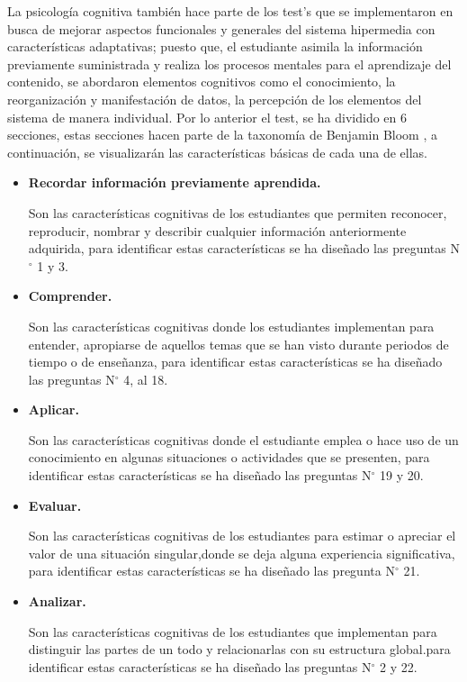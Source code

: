 La psicología cognitiva también hace parte de los test’s que se implementaron en busca de mejorar aspectos funcionales y generales del sistema hipermedia con características adaptativas; puesto que, el estudiante asimila la información previamente suministrada y realiza los procesos mentales para el aprendizaje del contenido, se abordaron elementos cognitivos como el conocimiento, la reorganización y manifestación de datos, la percepción de los elementos del sistema de manera individual. Por lo anterior el test, se ha dividido en 6 secciones, estas secciones hacen parte de la taxonomía de Benjamin Bloom \cite{Benjamin}, a continuación, se visualizarán las características básicas de cada una de ellas.

\begin{itemize}
    \item \textbf{Recordar información previamente aprendida.}
    
    Son las características cognitivas de los estudiantes que permiten reconocer, reproducir, nombrar y describir cualquier información anteriormente adquirida, para identificar estas características se ha diseñado las preguntas N$^{\circ}$ 1 y 3.
    
    \item \textbf{Comprender.}
    
    Son las características cognitivas donde los estudiantes implementan para entender, apropiarse de aquellos temas que se han visto durante periodos de tiempo o de enseñanza, para identificar estas características se ha diseñado las preguntas N$^{\circ}$ 4, al 18.
    
    \item \textbf{Aplicar.}
    
    Son las características cognitivas donde el estudiante emplea o hace uso de un conocimiento en algunas situaciones o actividades que se presenten, para identificar estas características se ha diseñado las preguntas N$^{\circ}$ 19 y 20.
    
    \item \textbf{Evaluar.}
    
    Son las características cognitivas de los estudiantes para estimar o apreciar el valor de una situación singular,donde se deja alguna experiencia significativa, para identificar estas características se ha diseñado las pregunta N$^{\circ}$  21.
    
    \item \textbf{Analizar.}
    
    Son las características cognitivas de los estudiantes que implementan para distinguir las partes de un todo y relacionarlas con su estructura global.para identificar estas características se ha diseñado las preguntas N$^{\circ}$ 2 y 22.
        \end{itemize}

